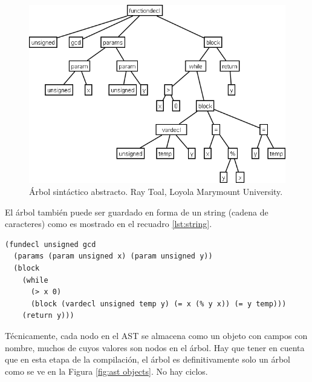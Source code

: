 \begin{figure}[ht]
    \centering
    \includegraphics[scale=0.3]{images/gcdast1.png}
    \caption{Árbol sintáctico abstracto. Ray Toal, Loyola Marymount University.}
    \label{fig:ast}
\end{figure}

El árbol también puede ser guardado en forma de un string (cadena de caracteres) como es mostrado en el recuadro \ref{lst:string}.

\begin{lstlisting}[label={lst:string}, caption={AST}, captionpos={b}, frame={shadowbox}]
(fundecl unsigned gcd
  (params (param unsigned x) (param unsigned y))
  (block
    (while
      (> x 0)
      (block (vardecl unsigned temp y) (= x (% y x)) (= y temp)))
    (return y)))
\end{lstlisting}

Técnicamente, cada nodo en el AST se almacena como un objeto con campos con nombre, muchos de cuyos valores son nodos en el árbol. Hay que tener en cuenta que en esta etapa de la compilación, el árbol es definitivamente solo un árbol como se ve en la Figura \ref{fig:ast objects}. No hay ciclos.\\

